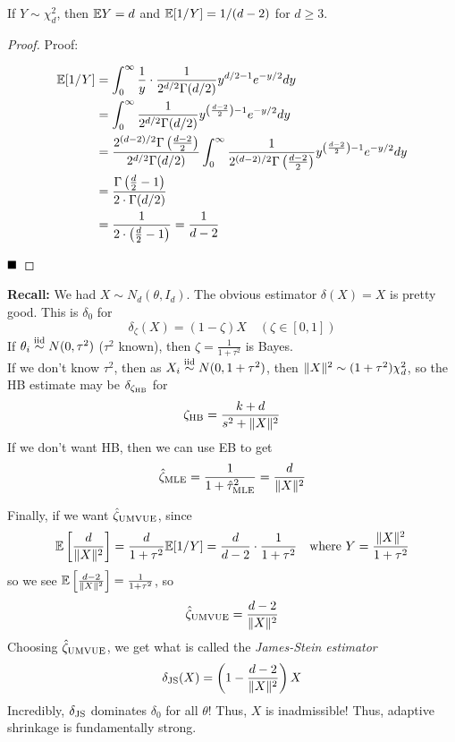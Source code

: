 
\begin{lemma}
   
    If $Y \sim \chi_d^2$, then $\E Y = d$ and $\E[1/Y] = 1/(d - 2)$ for $d \geq 3$.
\end{lemma}
\begin{proof}{Proof:}
    
    \begin{align*}
        \E[1/Y] &= \int_{0}^{\infty} \frac{1}{y} \cdot \frac{1}{2^{d/2}\Gamma(d/2)}y^{d/2 - 1}e^{-y/2} dy\\
        &= \int_{0}^{\infty} \frac{1}{2^{d/2}\Gamma(d/2)}y^{\left(\frac{d - 2}{2}\right) - 1}e^{-y/2} dy\\
        &= \frac{2^{(d - 2)/2}\Gamma\left(\frac{d - 2}{2}\right)}{2^{d/2}\Gamma(d/2)}\int_{0}^{\infty} \frac{1}{2^{(d - 2)/2}\Gamma\left(\frac{d - 2}{2}\right)}y^{\left(\frac{d - 2}{2}\right) - 1}e^{-y/2} dy\\
        &= \frac{\Gamma\left(\frac{d}{2} - 1\right)}{2 \cdot \Gamma(d/2)}\\
        &= \frac{1}{2 \cdot \left(\frac{d}{2} - 1\right)} = \frac{1}{d - 2}
    \end{align*}

    $\qed$
\end{proof}

\textbf{Recall:} We had $X \sim N_d(\theta, I_d)$. The obvious estimator $\delta(X) = X$ is pretty good. This is $\delta_0$ for
\[ \delta_{\zeta}(X) = (1 - \zeta)X \quad (\zeta \in [0, 1]) \]
If $\theta_i \iidsim N(0, \tau^2)$ ($\tau^2$ known), then $\zeta = \frac{1}{1 + \tau^2}$ is Bayes.\\

If we don't know $\tau^2$, then as $X_i \iidsim N(0, 1 + \tau^2)$, then $\norm{X}^2 \sim (1 + \tau^2)\chi_d^2$, so the HB estimate may be $\delta_{\zeta_{\tt{HB}}}$ for
\[ \zeta_{\tt{HB}} = \frac{k + d}{s^2 + \norm{X}^2} \]
If we don't want HB, then we can use EB to get
\[ \hat{\zeta}_{\tt{MLE}} = \frac{1}{1 + \hat{\tau}^2_{\tt{MLE}}} = \frac{d}{\norm{X}^2} \]

Finally, if we want $\hat{\zeta}_{\tt{UMVUE}}$, since
\[ \E\left[\frac{d}{\norm{X}^2}\right] = \frac{d}{1 + \tau^2}\E[1/Y] = \frac{d}{d - 2} \cdot \frac{1}{1 + \tau^2} \quad \tt{where } Y = \frac{\norm{X}^2}{1 + \tau^2} \]
so we see $\E\left[\frac{d - 2}{\norm{X}^2}\right] = \frac{1}{1 + \tau^2}$, so
\[ \hat{\zeta}_{\tt{UMVUE}} = \frac{d - 2}{\norm{X}^2} \]
Choosing $\hat{\zeta}_{\tt{UMVUE}}$, we get what is called the \emph{James-Stein estimator}
\[ \delta_{\tt{JS}}(X) = \left(1 - \frac{d - 2}{\norm{X}^2}\right)X \]
Incredibly, $\delta_{\tt{JS}}$ dominates $\delta_0$ for all $\theta$! Thus, $X$ is inadmissible! Thus, adaptive shrinkage is fundamentally strong.\\

